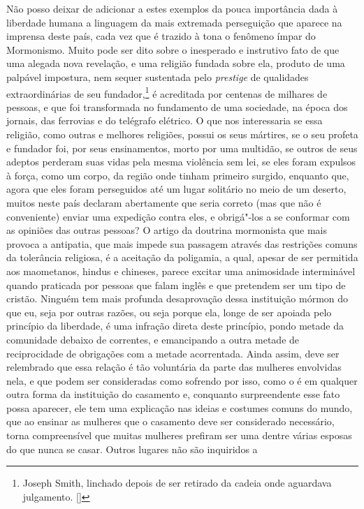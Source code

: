 Não posso deixar de adicionar a estes exemplos da pouca importância dada
à liberdade humana a linguagem da mais extremada perseguição que
aparece na imprensa deste país, cada vez que é trazido à tona o
fenômeno ímpar do Mormonismo. Muito pode ser dito sobre o inesperado e
instrutivo fato de que uma alegada nova revelação, e uma religião fundada
sobre ela, produto de uma palpável impostura, nem sequer sustentada pelo
\textit{prestige} de qualidades extraordinárias de seu
fundador,\footnote{ Joseph Smith, linchado depois de ser retirado 
da cadeia onde aguardava julgamento. []}
 é acreditada por centenas de milhares de pessoas, e que foi
transformada no fundamento de uma sociedade, na época dos jornais, das
ferrovias e do telégrafo elétrico. O que nos interessaria se essa
religião, como outras e melhores religiões, possui os seus mártires,
se o seu profeta e fundador foi, por seus ensinamentos, morto por uma
multidão, se outros de seus adeptos perderam suas vidas pela mesma
violência sem lei, se eles foram expulsos à força, como um corpo, da
região onde tinham primeiro surgido, enquanto que, agora que eles foram
perseguidos até um lugar solitário no meio de um deserto, muitos neste
país declaram abertamente que seria correto (mas que não é conveniente)
enviar uma expedição contra eles, e obrigá"-los a se conformar com as
opiniões das outras pessoas? O artigo da doutrina mormonista que mais
provoca a antipatia, que mais impede sua passagem através das restrições
comuns da tolerância religiosa, é a aceitação da poligamia, a qual,
apesar de ser permitida aos maometanos, hindus e chineses, parece
excitar uma animosidade interminável quando praticada por pessoas que
falam inglês e que pretendem ser um tipo de cristão. Ninguém tem mais
profunda desaprovação dessa instituição mórmon do que eu, seja por
outras razões, ou seja porque ela, longe de ser apoiada pelo princípio
da liberdade, é uma infração direta deste princípio, pondo metade da
comunidade debaixo de correntes, e emancipando a outra metade de
reciprocidade de obrigações com a metade acorrentada. Ainda assim, deve
ser relembrado que essa relação é tão voluntária da parte das mulheres
envolvidas nela, e que podem ser consideradas como sofrendo por isso,
como o é em qualquer outra forma da instituição do casamento e,
conquanto surpreendente esse fato possa aparecer, ele tem uma
explicação nas ideias e costumes comuns do mundo, que ao ensinar as
mulheres que o casamento deve ser considerado necessário, torna
compreensível que muitas mulheres prefiram ser uma dentre várias
esposas do que nunca se casar. Outros lugares não são inquiridos a
